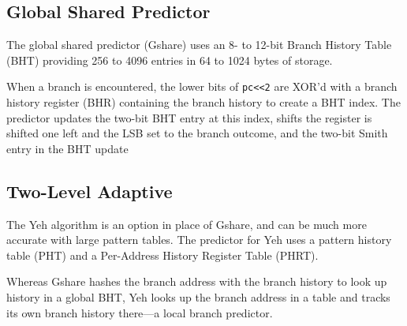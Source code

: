\subsection{Global Shared Predictor}

The global shared predictor (Gshare) uses an 8- to 12-bit Branch History Table
(BHT) providing 256 to 4096 entries in 64 to 1024 bytes of storage.

When a branch is encountered, the lower bits of \lstinline!pc<<2! are XOR'd
with a branch history register (BHR) containing the branch history to create a
BHT index.  The predictor updates the two-bit BHT entry at this index, shifts
the register is shifted one left and the LSB set to the branch outcome, and the
two-bit Smith entry in the BHT update

\subsection{Two-Level Adaptive}

The Yeh algorithm is an option in place of Gshare, and can be much more
accurate with large pattern tables.  The predictor for Yeh uses a pattern
history table (PHT) and a Per-Address History Register Table (PHRT).



Whereas Gshare hashes the branch address with the branch history to look up
history in a global BHT, Yeh looks up the branch address in a table and tracks
its own branch history there—a local branch predictor.
